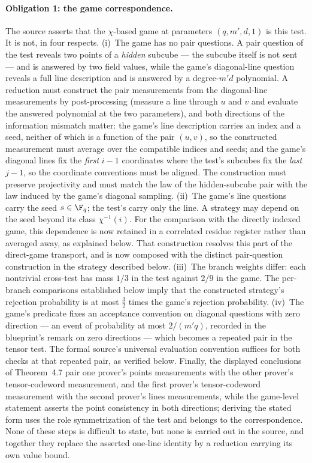 \documentclass[11pt]{article}
\begin{document}
\paragraph{Obligation 1: the game correspondence.}
The source asserts that the $\chi$-based game at parameters $(q,m',d,1)$
is this test.  It is not, in four respects.
(i)~The game has no pair questions.  A pair question of the test reveals
two points of a \emph{hidden} subcube --- the subcube itself is not sent
--- and is answered by two field values, while the game's diagonal-line
question reveals a full line description and is answered by a degree-$m'd$
polynomial.  A reduction must construct the pair measurements from the
diagonal-line measurements by post-processing (measure a line through $u$
and $v$ and evaluate the answered polynomial at the two parameters), and
both directions of the information mismatch matter: the game's line
description carries an index and a seed, neither of which is a function of
the pair $(u,v)$, so the constructed measurement must average over the
compatible indices and seeds; and the game's diagonal lines fix the
\emph{first} $i-1$ coordinates where the test's subcubes fix the
\emph{last} $j-1$, so the coordinate conventions must be aligned.  The
construction must preserve projectivity and must match the law of the
hidden-subcube pair with the law induced by the game's diagonal sampling.
(ii)~The game's line questions carry the seed $s \in \F_q$; the test's carry
only the line.  A strategy may depend on the seed beyond its class
$\chi^{-1}(i)$.  For the comparison with the directly indexed game, this
dependence is now retained in a correlated residue register rather than
averaged away, as explained below.  That construction resolves this part of
the direct-game transport, and is now composed with the distinct pair-question
construction in the strategy described below.
(iii)~The branch weights differ: each nontrivial cross-test has mass $1/3$
in the test against $2/9$ in the game. The per-branch comparisons established
below imply that the constructed strategy's rejection probability is at most
$\tfrac32$ times the game's rejection probability.
(iv)~The game's predicate fixes an acceptance convention on diagonal
questions with zero direction --- an event of probability at most
$2/(m'q)$, recorded in the blueprint's remark on zero directions --- which
becomes a repeated pair in the tensor test. The formal source's universal
evaluation convention suffices for both checks at that repeated pair,
as verified below.
Finally, the displayed conclusions of Theorem~4.7 pair one prover's points
measurements with the other prover's tensor-codeword measurement, and the
first prover's tensor-codeword measurement with the second prover's lines
measurements, while the game-level statement asserts the point consistency
in both directions; deriving the stated form uses the role symmetrization
of the test and belongs to the correspondence.  None of these steps is
difficult to state, but none is carried out in the source, and together
they replace the asserted one-line identity by a reduction carrying its
own value bound.
\end{document}
